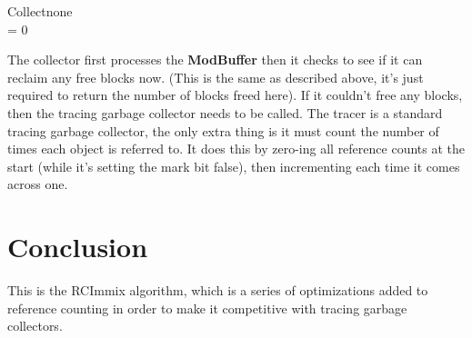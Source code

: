 \documentclass{article}
\begin{document}
\begin{pseudocode}{Collect}{none}
	\\
	\IF {} = 0 \THEN
\end{pseudocode}

The collector first processes the \textbf{ModBuffer} then it checks to see if it can reclaim any free blocks now. (This is the same  as described above, it's just required to return the number of blocks freed here). If it couldn't free any blocks, then the tracing garbage collector needs to be called. The tracer is a standard tracing garbage collector, the only extra thing is it must count the number of times each object is referred to. It does this by zero-ing all reference counts at the start (while it's setting the mark bit false), then incrementing each time it comes across one.

\section{Conclusion}

This is the RCImmix algorithm, which is a series of optimizations added to reference counting in order to make it competitive with tracing garbage collectors.



\end{document}
